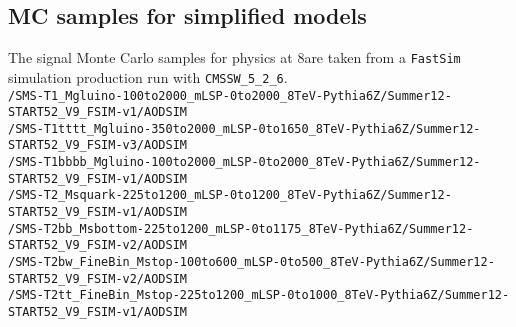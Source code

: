 \subsection{MC samples for simplified models}

The signal Monte Carlo samples for physics at 8\TeV are taken from a 
\verb!FastSim! simulation production run with \verb!CMSSW_5_2_6!. \\
{\footnotesize
\verb!/SMS-T1_Mgluino-100to2000_mLSP-0to2000_8TeV-Pythia6Z/Summer12-START52_V9_FSIM-v1/AODSIM! \\
\verb!/SMS-T1tttt_Mgluino-350to2000_mLSP-0to1650_8TeV-Pythia6Z/Summer12-START52_V9_FSIM-v3/AODSIM! \\
\verb!/SMS-T1bbbb_Mgluino-100to2000_mLSP-0to2000_8TeV-Pythia6Z/Summer12-START52_V9_FSIM-v1/AODSIM! \\ 
\verb!/SMS-T2_Msquark-225to1200_mLSP-0to1200_8TeV-Pythia6Z/Summer12-START52_V9_FSIM-v1/AODSIM! \\
\verb!/SMS-T2bb_Msbottom-225to1200_mLSP-0to1175_8TeV-Pythia6Z/Summer12-START52_V9_FSIM-v2/AODSIM! \\
\verb!/SMS-T2bw_FineBin_Mstop-100to600_mLSP-0to500_8TeV-Pythia6Z/Summer12-START52_V9_FSIM-v2/AODSIM! \\
\verb!/SMS-T2tt_FineBin_Mstop-225to1200_mLSP-0to1000_8TeV-Pythia6Z/Summer12-START52_V9_FSIM-v1/AODSIM! 
}
